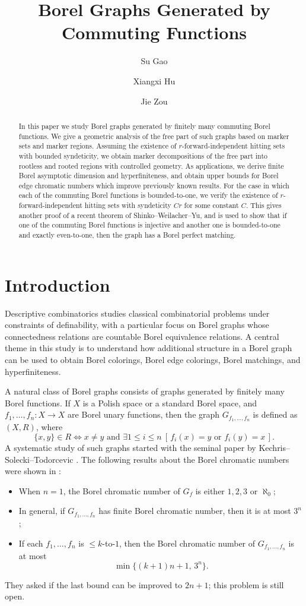 \documentclass[11pt, reqno, a4paper]{amsart}
\title{Borel Graphs Generated by Commuting Functions}
\author{Su Gao}
\author{Xiangxi Hu}
\author{Jie Zou}
\theoremstyle{definition}
\theoremstyle{plain}
\begin{document}
\maketitle
\begin{abstract}
In this paper we study Borel graphs generated by finitely many commuting Borel functions. We give a geometric analysis of the free part of such graphs based on marker sets and marker regions.  Assuming the existence of 
$r$-forward-independent hitting sets with bounded syndeticity, we obtain marker decompositions of 
the free part into rootless and rooted regions with controlled geometry. As
applications, we derive finite Borel asymptotic dimension and hyperfiniteness, and obtain upper bounds for Borel edge
chromatic numbers which improve previously known results. For the case in which each of the commuting Borel functions is  bounded-to-one, we verify the existence of $r$-forward-independent hitting sets with syndeticity $Cr$ for some constant $C$. This gives another proof of a recent theorem of Shinko--Weilacher--Yu, and is used to show that if one of the commuting Borel functions is injective and another one is bounded-to-one and exactly even-to-one, then the graph has a Borel perfect matching.
\end{abstract}
\section{Introduction}

Descriptive combinatorics studies classical combinatorial problems under constraints of definability, with a particular focus on Borel graphs whose connectedness relations are countable Borel equivalence relations. A central theme in this study is to understand how additional structure in a Borel graph can
be used to obtain Borel colorings, Borel edge colorings, Borel matchings, and
hyperfiniteness. 

A natural class of Borel graphs consists of graphs generated
by finitely many Borel functions. If $X$ is a Polish space or a standard Borel space, and $f_1, \dots, f_n\colon X \to X$ are Borel unary functions, then the graph $G_{f_1,\dots, f_n}$ is defined as $(X, R)$, where
$$ \{x, y\}\in R\iff x\neq y \mbox{ and } \exists 1\leq i\leq n\ [\, f_i(x)=y \mbox{ or } f_i(y)=x\, ]. $$
A systematic study of such graphs started with the seminal paper by Kechris--Solecki--Todorcevic \cite{KechrisSoleckiTodorcevic1999}. The following results about the Borel chromatic numbers were shown in \cite{KechrisSoleckiTodorcevic1999}:
\begin{itemize}
\item When $n=1$, the Borel chromatic number of $G_f$ is either $1, 2, 3$ or $\aleph_0$;
\item In general, if $G_{f_1,\dots, f_n}$ has finite Borel chromatic number, then it is at most $3^n$;
\item If each $f_1, \dots, f_n$ is $\leq\!k$-to-$1$, then the Borel chromatic number of $G_{f_1,\dots, f_n}$ is at most
$$ \min\{(k+1)n+1, \, 3^n\}. $$
\end{itemize}
They asked if the last bound can be improved to $2n+1$; this problem is still open. 
\end{document}
